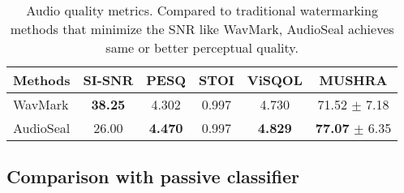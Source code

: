 \begin{table}[t!]
    \centering
    \caption{
        Audio quality metrics. 
        Compared to traditional watermarking methods that minimize the SNR like WavMark, AudioSeal achieves same or better perceptual quality.
    }\label{chap4/tab:audio_quality}
    \footnotesize
        \begin{tabular}{lccccc}
            \toprule
            \textbf{Methods} & \textbf{SI-SNR} & \textbf{PESQ} & \textbf{STOI} & \textbf{ViSQOL} & \textbf{MUSHRA}  \\
            \midrule
            WavMark & \textbf{38.25} & 4.302 & 0.997 & 4.730 & 71.52 $\pm$ 7.18\\
            AudioSeal & 26.00 & \textbf{4.470} & 0.997 & \textbf{4.829} &  \textbf{77.07} $\pm$ 6.35 \\
            \bottomrule
        \end{tabular}
\end{table}















\subsection{Comparison with passive classifier}\label{chap4/sec:active-passive}


